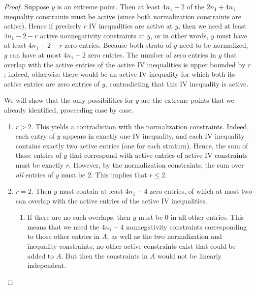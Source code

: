 \begin{proof}
  Suppose $y$ is an extreme point.
  Then at least $4n_1 - 2$ of the $2n_1 + 4n_1$ inequality constraints must be active (since both normalization constraints are active).
  Hence if precisely $r$ IV inequalities are active at $y$, then we need at least $4n_1 - 2 - r$ active nonnegativity constraints at $y$, or in other words, $y$ must have at least $4n_1 - 2 - r$ zero entries.
  Because both strata of $y$ need to be normalized, $y$ can have at most $4n_1 - 2$ zero entries.
  The number of zero entries in $y$ that overlap with the active entries of the active IV inequalities is upper bounded by $r$; indeed, otherwise there would be an active IV inequality for which both its active entries are zero entries of $y$, contradicting that this IV inequality is active.

  We will show that the only possibilities for $y$ are the extreme points that we already identified, proceeding case by case.
  \begin{enumerate}
    \item $r > 2$.
      This yields a contradiction with the normalization constraints.
      Indeed, each entry of $y$ appears in exactly one IV inequality, and each IV inequality contains exactly two active entries (one for each stratum).
      Hence, the sum of those entries of $y$ that correspond with active entries of active IV constraints must be exactly $r$.
      However, by the normalization constraints, the sum over \emph{all} entries of $y$ must be 2.
      This implies that $r \le 2$.
    \item $r = 2$.
      Then $y$ must contain at least $4n_1-4$ zero entries, of which at most two can overlap with the active entries of the active IV inequalities.
      \begin{enumerate}
        \item If there are no such overlaps, then $y$ must be 0 in all other entries.
          This means that we need the $4n_1-4$ nonnegativity constraints corresponding to those other entries in $A$, as well as the two normalization and inequality constraints; no other active constraints exist that could be added to $A$.
          But then the constraints in $A$ would not be linearly independent.

\end{enumerate}
\end{enumerate}
\end{proof}
